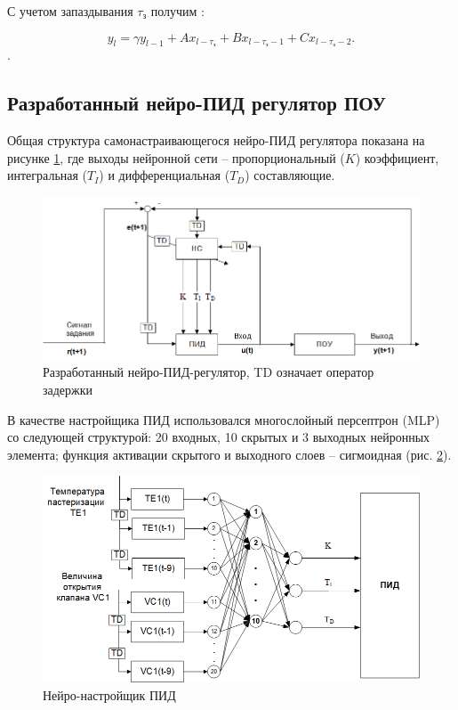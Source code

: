С учетом запаздывания $\tau_\text{з}$ получим \cite{Нетушил1978}:

\begin{equation}
    y_l = \gamma y_{l - 1} + Ax_{l - \tau_\text{з}} + Bx_{l - \tau_\text{з} - 1} + Cx_{l - \tau_\text{з} - 2}.
\end{equation}.

\subsection{Разработанный нейро-ПИД регулятор ПОУ}

Общая структура самонастраивающегося нейро-ПИД регулятора показана на рисунке \ref{fig:neuro_PID_controller}, где выходы нейронной сети – пропорциональный ($K$) коэффициент, интегральная ($T_I$) и дифференциальная ($T_D$) составляющие.

\begin{figure}[H]
    \centering
    \includegraphics[width=\textwidth]{images/chapter_2/Разработанный нейро-контроллер.png}
    \caption{Разработанный нейро-ПИД-регулятор, TD означает оператор задержки}
    \label{fig:neuro_PID_controller}
\end{figure}

В качестве настройщика ПИД использовался многослойный персептрон (MLP) со следующей структурой: 20 входных, 10 скрытых и 3 выходных нейронных элемента; функция активации скрытого и выходного слоев – сигмоидная (рис. \ref{fig:PID_neuro_tuner}).

\begin{figure}[H]
    \centering
    \includegraphics[width=\textwidth]{images/chapter_2/Нейро-настройщик ПИД.png}
    \caption{Нейро-настройщик ПИД}
    \label{fig:PID_neuro_tuner}
\end{figure}

